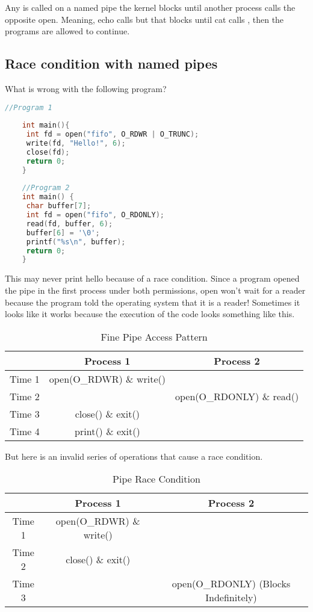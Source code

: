 	Any  is called on a named pipe the kernel blocks until another process calls the opposite open. Meaning, echo calls  but that blocks until cat calls , then the programs are allowed to continue.
	 
	\subsection{Race condition with named pipes}
	 
	What is wrong with the following program?
	 
	\begin{lstlisting}[language=C]
	//Program 1
	 
	int main(){
	 int fd = open("fifo", O_RDWR | O_TRUNC);
	 write(fd, "Hello!", 6);
	 close(fd);
	 return 0;
	}
	 
	//Program 2
	int main() {
	 char buffer[7];
	 int fd = open("fifo", O_RDONLY);
	 read(fd, buffer, 6);
	 buffer[6] = '\0';
	 printf("%s\n", buffer);
	 return 0;
	}
	\end{lstlisting}
	 
	This may never print hello because of a race condition.
	Since a program opened the pipe in the first process under both permissions, open won't wait for a reader because the program told the operating system that it is a reader!
	Sometimes it looks like it works because the execution of the code looks something like this.
	 
	\begin{center}
	\begin{table}[h]
	\caption{Fine Pipe Access Pattern}
	\begin{tabular}{|c|c|c|}
	 & Process 1 & Process 2 \\ \hline
	 Time 1 & open(O\_RDWR) \& write() & \\
	 Time 2 & & open(O\_RDONLY) \& read() \\
	 Time 3 & close() \& exit() & \\
	 Time 4 & print() \& exit() & \\
	\end{tabular}
	\end{table}
	\end{center}
	 
	But here is an invalid series of operations that cause a race condition.
	 
	\begin{center}
	\begin{table}[h]
	\caption{Pipe Race Condition}
	\begin{tabular}{|c|c|c|}
	 & Process 1 & Process 2 \\ \hline
	 Time 1 & open(O\_RDWR) \& write() & \\
	 Time 2 & close() \& exit() & \\
	 Time 3 & & open(O\_RDONLY) (Blocks Indefinitely) \\
	\end{tabular}
	\end{table}
	\end{center}
	 
